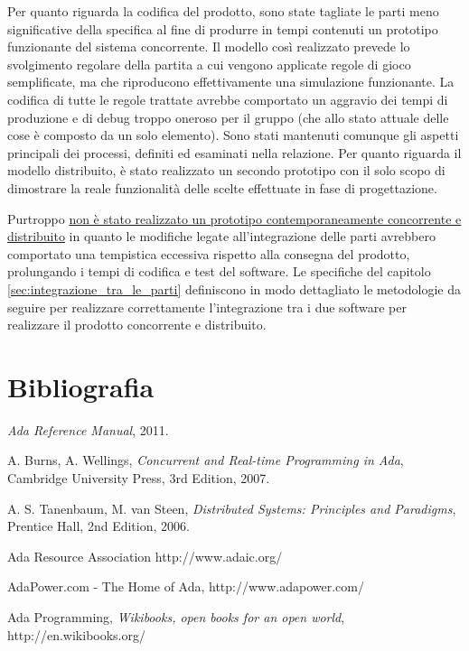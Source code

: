 \documentclass[aps,letterpaper,10pt]{article}
\begin{document}
Per quanto riguarda la codifica del prodotto, sono state tagliate le parti meno significative della specifica al fine di
produrre in tempi contenuti un prototipo funzionante del sistema concorrente. Il modello cos\`i realizzato prevede lo svolgimento regolare della partita a cui vengono applicate regole di gioco semplificate, ma che riproducono effettivamente una simulazione funzionante. La codifica di tutte le regole trattate avrebbe comportato un aggravio dei tempi di produzione
e di debug troppo oneroso per il gruppo (che allo stato attuale delle cose \`e composto da un solo elemento). Sono stati
mantenuti comunque gli aspetti principali dei processi, definiti ed esaminati nella relazione. Per quanto riguarda il modello distribuito, \`e stato realizzato un secondo prototipo con il solo scopo di dimostrare la reale funzionalit\`a delle scelte effettuate in fase di progettazione. \vspace{3mm}

Purtroppo \underline{non \`e stato realizzato un prototipo contemporaneamente concorrente e distribuito} in quanto le modifiche legate all'integrazione delle parti avrebbero comportato una tempistica eccessiva rispetto alla consegna del prodotto, prolungando i tempi di codifica e test del software. Le specifiche del capitolo \ref{sec:integrazione_tra_le_parti} definiscono in modo dettagliato le metodologie da seguire per realizzare correttamente l'integrazione tra i due software per realizzare il prodotto concorrente e distribuito.

\newpage

\section{Bibliografia}

\begin{thebibliography}{99}

\emph{Ada Reference Manual},
2011.

A. Burns, A. Wellings,
\emph{Concurrent and Real-time Programming in Ada},
Cambridge University Press,
3rd Edition,
2007.

A. S. Tanenbaum, M. van Steen,
\emph{Distributed Systems: Principles and Paradigms},
Prentice Hall,
2nd Edition,
2006.

Ada Resource Association
http://www.adaic.org/

AdaPower.com - The Home of Ada,
http://www.adapower.com/

Ada Programming, 
\emph{Wikibooks, open books for an open world}, 
http://en.wikibooks.org/

\end{thebibliography}
\end{document}
